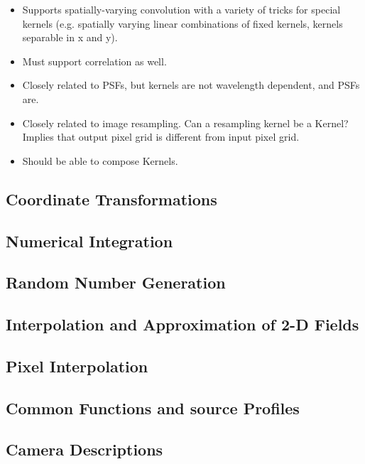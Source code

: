 \begin{itemize}
\item Supports spatially-varying convolution with a variety of tricks for special kernels (e.g. spatially varying linear combinations of fixed kernels, kernels separable in x and y).
\item Must support correlation as well.
\item Closely related to PSFs, but kernels are not wavelength dependent, and PSFs are.
\item Closely related to image resampling.  Can a resampling kernel be a Kernel?  Implies that output pixel grid is different from input pixel grid.
\item Should be able to compose Kernels.
\end{itemize}

\subsection{Coordinate Transformations}
\label{sec:spWCS}

\subsection{Numerical Integration}
\label{sec:spIntegration}

\subsection{Random Number Generation}
\label{sec:spRandomNumbers}

\subsection{Interpolation and Approximation of 2-D Fields}
\label{sec:spInterpApprox}

\subsection{Pixel Interpolation}
\label{sec:spPixelInterpolation}

\subsection{Common Functions and source Profiles}
\label{sec:spFunctions}

\subsection{Camera Descriptions}
\label{sec:spCameraDescriptions}

